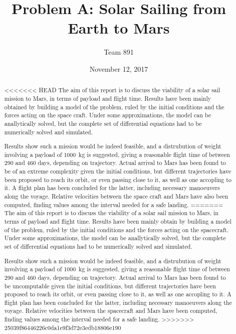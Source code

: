 \documentclass[twocolumn,12pt,a4paper]{article}
\author{\textsf{Team 891}}
\title{\textsf{\textbf{Problem A: Solar Sailing from Earth to Mars}}}
\date{\textsf{November 12, 2017}}
\numberwithin{equation}{section}
\begin{document}
\renewcommand{\abstractname}{}
\renewcommand{\absnamepos}{empty}
\begin{titlingpage}
 \maketitle

\noindent \hrulefill \\
\begin{abstract}
<<<<<<< HEAD
The aim of this report is to discuss the viability of a solar sail mission to Mars, in terms of payload and flight time. Results have been mainly obtained by building a model of the problem, ruled by the initial conditions and the forces acting on the space craft. Under some approximations, the model can be anallytically solved, but the complete set of differential equations had to be numerically solved and simulated. 

Results show such a mission would be indeed feasible, and a distrubution of weight involving a payload of \SI{1000}{kg} is suggested, giving a reasonable flight time of between 290 and 460 days, depending on trajectory. Actual arrival to Mars has been found to be of an extreme complexity given the initial conditions, but different trajectories have been proposed to reach its orbit, or even passing close to it, as well as one accopling to it. A flight plan has been concluded for the latter, including necessary manoeuvers along the voyage. Relative velocities between the space craft and Mars have also been computed, finding values among the interval needed for a safe landing.
=======
The aim of this report is to discuss the viability of a solar sail mission to Mars, in terms of payload and flight time. Results have been mainly obtain by building a model of the problem, ruled by the initial conditions and the forces acting on the spacecraft. Under some approximations, the model can be anallytically solved, but the complete set of differential equations had to be numerically solved and simulated. 

Results show such a mission would be indeed feasible, and a distrubution of weight involving a payload of \SI{1000}{kg} is suggested, giving a reasonable flight time of between 290 and 460 days, depending on trajectory. Actual arrival to Mars has been found to be uncomputable given the initial conditions, but different trajectories have been proposed to reach its orbit, or even passing close to it, as well as one accopling to it. A flight plan has been concluded for the latter, including necessary manoeuvers along the voyage. Relative velocities between the spacecraft and Mars have been computed, finding values among the interval needed for a safe landing.
>>>>>>> 25039f86446226c0da1e9f3d72e3edb18806e190

\end{abstract}
\hrulefill \\

\end{titlingpage}
\end{document}
